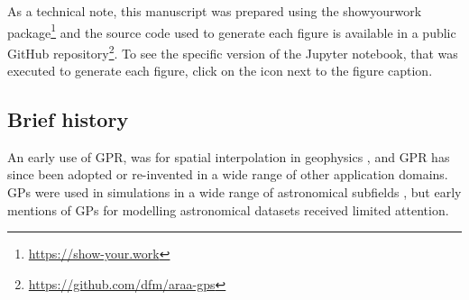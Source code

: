\documentclass[letterpaper]{ar-1col}
\newcommand{\project}[1]{\textsf{#1}}
\begin{document}

As a technical note, this manuscript was prepared using the \project{showyourwork} package\footnote{\url{https://show-your.work}} and the source code used to generate each figure is available in a public \project{GitHub} repository\footnote{\url{https://github.com/dfm/araa-gps}}.
To see the specific version of the \project{Jupyter} notebook, that was executed to generate each figure, click on the icon next to the figure caption.

\subsection{Brief history}

An early use of GPR, was for spatial interpolation in geophysics \citep{kriging}, and GPR has since been adopted or re-invented in a wide range of other application domains. GPs were used in simulations in a wide range of astronomical subfields \citep[see e.g.][]{1980asfr.symp..159B,1988JGR....9311569C,1997ApJ...483L...1P}, but early mentions of GPs for modelling astronomical datasets \citep[see e.g.][]{1976MitAG..38..192D,1978A&A....70..777V,1991MGeo...16..313J} received limited attention.
\end{document}
